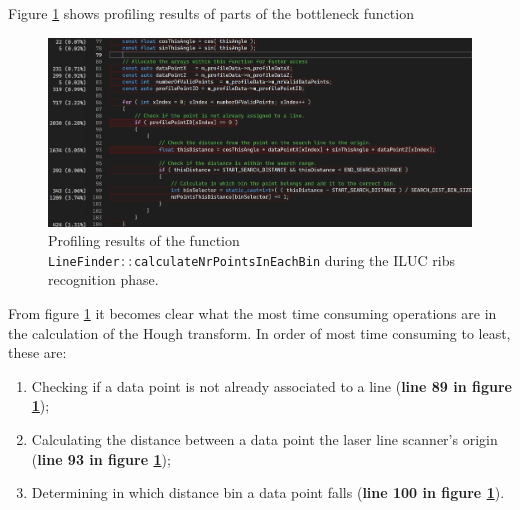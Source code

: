 Figure \ref{fig:profiling_bottleneck} shows profiling results of parts of the bottleneck function
\begin{figure}[H]
    \includegraphics[width=\textwidth]{images/profiling_bottleneck.png}
    \caption{Profiling results of the function \lstinline[language=c]|LineFinder::calculateNrPointsInEachBin| during the ILUC ribs recognition phase.}
    \label{fig:profiling_bottleneck}
\end{figure}

From figure \ref{fig:profiling_bottleneck} it becomes clear what the most time consuming operations are in the calculation of the Hough transform. In order of most time consuming to least, these are:
\begin{enumerate}
    \item Checking if a data point is not already associated to a line (\textbf{line 89 in figure \ref{fig:profiling_bottleneck}});
    \item Calculating the distance between a data point the laser line scanner's origin (\textbf{line 93 in figure \ref{fig:profiling_bottleneck}});
    \item  Determining in which distance bin a data point falls (\textbf{line 100 in figure \ref{fig:profiling_bottleneck}}).
\end{enumerate}
